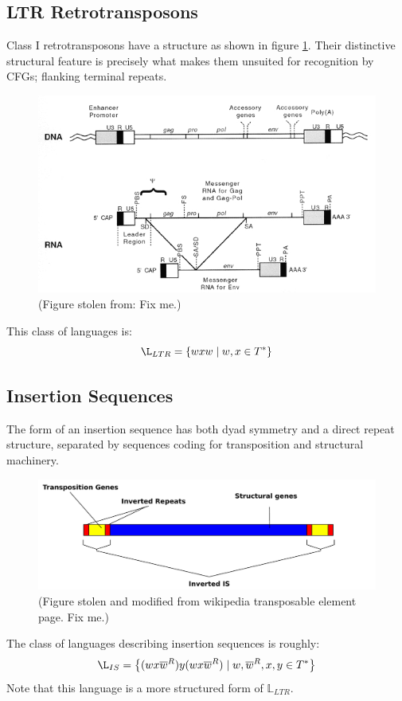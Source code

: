 \documentclass[11pt]{article}
\begin{document}
\subsection {LTR Retrotransposons}
Class I retrotransposons have a structure as shown in figure \ref{fig:LTR}. Their distinctive structural feature is precisely
what makes them unsuited for recognition by CFGs; flanking terminal repeats.
\begin{figure}[H] 
  \centering 
  \includegraphics[scale=0.5]{./figure2-4.jpg}
  \caption{(Figure stolen from: \cite{CoffinJMHughesSHVarmusHE1997} Fix me.)}
  \label{fig:LTR}
\end{figure}
This class of languages is:
\[
\L_{LTR} = \left \{ wxw \mid w,x \in T^* \right \}
\]

\subsection {Insertion Sequences}
The form of an insertion sequence has both dyad symmetry and a direct repeat structure, separated by sequences coding
for transposition and structural machinery.
\begin{figure}[H]
  \centering 
  \includegraphics[scale=0.50]{./Composite_transposon.pdf}
  \caption{(Figure stolen and modified from wikipedia transposable element page. Fix me.)}
  \label{fig:IS}
\end{figure}
\noindent
The class of languages describing insertion sequences is roughly:\\
\[
\L_{IS} = \left \{ (wx\overline{w}^R)y(wx\overline{w}^R) \mid w,\overline{w}^R,x,y \in T^* \right \}
\]
Note that this language is a more structured form of $\mathds{L}_{LTR}$.\\
\end{document}
